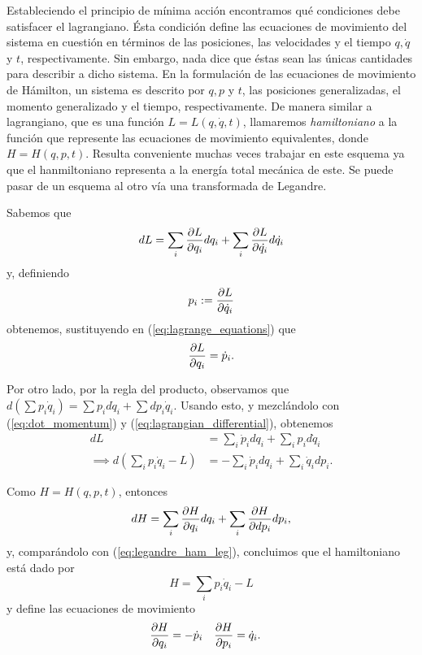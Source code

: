Estableciendo el principio de mínima acción encontramos qué condiciones debe satisfacer el lagrangiano. Ésta condición define las ecuaciones de movimiento del sistema en cuestión en términos de las posiciones, las velocidades y el tiempo $q, \dot{q}$ y $t$, respectivamente. Sin embargo, nada dice que éstas sean las únicas cantidades para describir a dicho sistema. En la formulación de las ecuaciones de movimiento de Hámilton, un sistema es descrito por $q,p$ y $t$, las posiciones generalizadas, el momento generalizado y el tiempo, respectivamente. De manera similar a lagrangiano, que es una función $L = L(q,\dot{q},t)$, llamaremos \textit{hamiltoniano} a la función que represente las ecuaciones de movimiento equivalentes, donde $H = H(q,p,t)$. Resulta conveniente muchas veces trabajar en este esquema ya que el hanmiltoniano representa a la energía total mecánica de este. Se puede pasar de un esquema al otro vía una transformada de Legandre.

Sabemos que 
\begin{equation}
 dL = \sum_i \frac{\partial L}{\partial q_i} d q_i + \sum_i \frac{\partial L}{\partial \dot{q_i} }  d\dot{q_i}
 \label{eq:lagrangian_differential}
\end{equation}
y, definiendo 
\begin{equation}
 p_i := \frac{\partial L}{\partial \dot{q}_i}
\end{equation} 
obtenemos, sustituyendo en (\ref{eq:lagrange_equations}) que
\begin{equation}
 \frac{\partial L}{\partial q_i} = \dot{p}_i.
 \label{eq:dot_momentum}
\end{equation}

Por otro lado, por la regla del producto, observamos que $d\left( \sum p_i \dot{q}_i \right) = \sum p_i d \dot{q}_i + \sum d p_i \dot{q}_i$. Usando esto, y mezclándolo con (\ref{eq:dot_momentum}) y (\ref{eq:lagrangian_differential}), obtenemos
\begin{align}
 dL &= \sum_i \dot{p}_i d q_i + \sum_i p_i d \dot{q}_i \nonumber \\
 \implies d\left(\sum_i p_i \dot{q}_i - L \right) &= - \sum_i \dot{p}_i d q_i + \sum_i \dot{q}_i d p_i.
 \label{eq:legandre_ham_lag}
\end{align}

Como $H = H(q,p,t)$, entonces 
\begin{equation}
 dH = \sum_i \frac{\partial H}{\partial q_i} dq_i + \sum_i \frac{\partial H}{\partial dp_i} dp_i,
 \label{eq:hamilton_differential}
\end{equation}
y, comparándolo con (\ref{eq:legandre_ham_leg}), concluimos que el hamiltoniano está dado por
\begin{equation}
 H = \sum_i p_i \dot{q}_i - L
 \label{eq:hamiltonian_legandre}
\end{equation}
y define las ecuaciones de movimiento
\begin{align}
 &\frac{\partial H}{\partial q_i} = - \dot{p}_i && \frac{\partial H}{\partial p_i} = \dot{q}_i.
\end{align}

